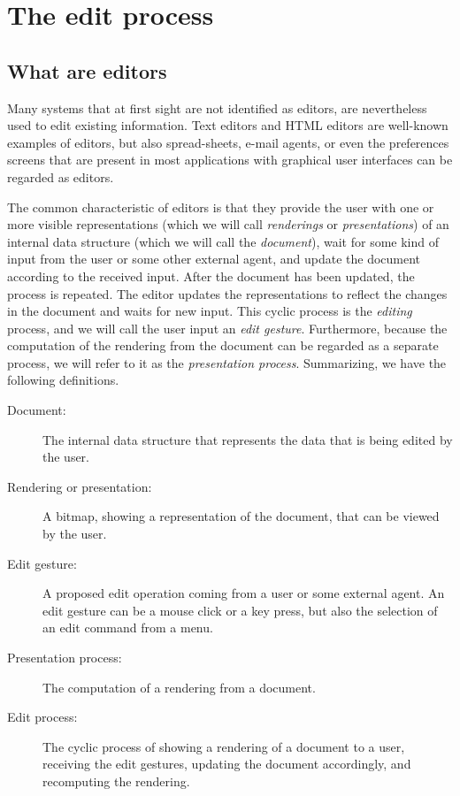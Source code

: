 \section{The edit process}
\label{problem}

{\bf }
\subsection{What are editors}


{\bf }Many systems that at first sight are not identified as editors, are nevertheless used to edit existing information. Text editors and HTML editors are well-known examples of editors, but also spread-sheets, e-mail agents, or even the preferences screens that are present in most applications with graphical user interfaces can be regarded as editors. 

The common characteristic of editors is that they provide the user with one or more visible representations (which we will call {\em renderings} or {\em presentations}) of an internal data structure (which we will call the {\em document}), wait for some kind of input from the user or some other external agent, and update the document according to the received input. After the document has been updated, the process is repeated. The editor updates the representations to reflect the changes in the document and waits for new input. This cyclic process is the {\em editing} process, and we will call the user input an {\em edit gesture}. Furthermore, because the computation of the rendering from the document can be regarded as a separate process, we will refer to it as the {\em presentation process}. Summarizing, we have the following definitions.
 \begin{description}
 
 \item[Document:]
 The internal data structure that represents the data that is being
          edited by the user.
 \item[Rendering or presentation: ]
 A bitmap, showing a representation of the document, that can be
          viewed by the user.
 \item[Edit gesture:]
A proposed edit operation coming from a user or some external
          agent. An edit gesture can be a mouse click or a key press, but also the
          selection of an edit command from a menu.
 \item[Presentation process:]
The computation of a rendering from a document.
 \item[Edit process:]
The cyclic process of showing a rendering of a document to a user,
          receiving the edit gestures, updating the document accordingly, and recomputing
          the rendering.
 \end{description}






